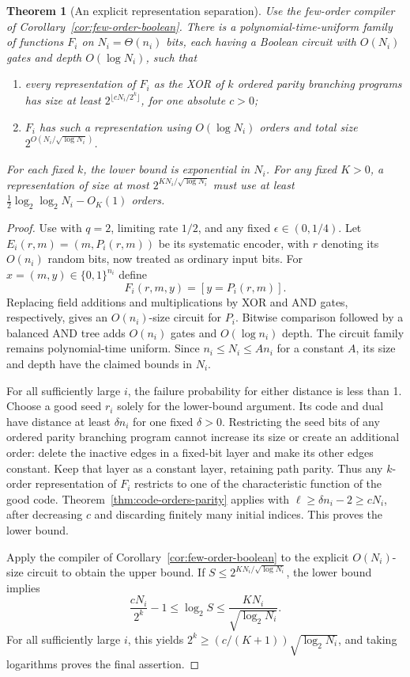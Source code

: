\documentclass[11pt]{article}
\newtheorem{theorem}{Theorem}[section]
\theoremstyle{definition}
\theoremstyle{remark}
\begin{document}
\begin{theorem}[An explicit representation separation]
\label{thm:fast-code-order-separation}
Use the few-order compiler of Corollary~\ref{cor:few-order-boolean}.
There is a polynomial-time-uniform family of functions $F_i$ on
$N_i=\Theta(n_i)$ bits, each having a Boolean circuit with $O(N_i)$
gates and depth $O(\log N_i)$, such that
\begin{enumerate}
\item every representation of $F_i$ as the XOR of $k$ ordered parity
      branching programs has size at least
      $2^{\lfloor cN_i/2^k\rfloor}$, for one absolute $c>0$;
\item $F_i$ has such a representation using $O(\log N_i)$ orders
      and total size $2^{O(N_i/\sqrt{\log N_i})}$.
\end{enumerate}
For each fixed $k$, the lower bound is exponential in $N_i$.
For any fixed $K>0$, a representation of size at most
$2^{K N_i/\sqrt{\log N_i}}$ must use at least
$\tfrac12\log_2\log_2N_i-O_K(1)$ orders.
\end{theorem}
\begin{proof}
Use \cite[Theorem~9]{BIR26} with $q=2$, limiting rate $1/2$,
and any fixed $\epsilon\in(0,1/4)$.
Let $E_i(r,m)=(m,P_i(r,m))$ be its systematic encoder, with $r$
denoting its $O(n_i)$ random bits, now treated as ordinary input bits.
For $x=(m,y)\in\{0,1\}^{n_i}$ define
\[
                    F_i(r,m,y)=[y=P_i(r,m)].
\]
Replacing field additions and multiplications by XOR and AND gates,
respectively, gives an $O(n_i)$-size circuit for $P_i$.
Bitwise comparison followed by a balanced AND tree adds $O(n_i)$
gates and $O(\log n_i)$ depth.
The circuit family remains polynomial-time uniform.
Since $n_i\le N_i\le A n_i$ for a constant $A$, its size and depth
have the claimed bounds in $N_i$.

For all sufficiently large $i$, the failure probability for either
distance is less than 1.  Choose a good seed $r_i$ solely for the
lower-bound argument.  Its code and dual have distance at least
$\delta n_i$ for one fixed $\delta>0$.
Restricting the seed bits of any ordered parity branching program
cannot increase its size or create an additional order: delete the
inactive edges in a fixed-bit layer and make its other edges constant.
Keep that layer as a constant layer, retaining path parity.
Thus any $k$-order representation of $F_i$ restricts to one of
the characteristic function of the good code.
Theorem~\ref{thm:code-orders-parity} applies with
$\ell\ge\delta n_i-2\ge cN_i$, after decreasing $c$ and discarding
finitely many initial indices.  This proves the lower bound.

Apply the compiler of Corollary~\ref{cor:few-order-boolean} to the
explicit $O(N_i)$-size circuit to
obtain the upper bound.  If $S\le2^{K N_i/\sqrt{\log N_i}}$, the lower
bound implies
\[
 \frac{cN_i}{2^k}-1\le\log_2S
       \le\frac{K N_i}{\sqrt{\log_2N_i}}.
\]
For all sufficiently large $i$, this yields
$2^k\ge(c/(K+1))\sqrt{\log_2N_i}$, and taking logarithms proves
the final assertion.
\end{proof}
\end{document}
